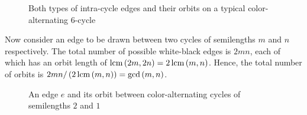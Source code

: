 \documentclass[sectionflow,singlespace,twoside]{brandiss} %
\numberwithin{section}{chapter}
\numberwithin{figure}{chapter}
\begin{document}
\begin{figure}[htb]
  \centering
  \hfill
  \caption[Two example edge-orbits in a color-reversing isomorphism]{Both types of intra-cycle edges and their orbits on a typical color-alternating $6$-cycle}
  \label{fig:exbctincyc}
\end{figure}

Now consider an edge to be drawn between two cycles of semilengths $m$ and $n$ respectively.
The total number of possible white-black edges is $2mn$, each of which has an orbit length of $\operatorname{lcm} \left( {2m, 2n} \right) = 2 \operatorname{lcm} \left( {m, n} \right)$.
Hence, the total number of orbits is $2mn / \left( {2 \operatorname{lcm} \left( {m, n} \right)} \right) = \gcd \left( {m, n} \right)$.

\begin{figure}[htb]
  \centering
  \caption[Another example edge-orbit of a color-reversing isomorphism]{An edge $e$ and its orbit between color-alternating cycles of semilengths $2$ and $1$}
  \label{fig:exbctbtwcyc}
\end{figure}
\end{document}
